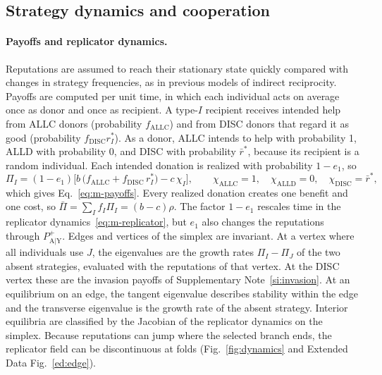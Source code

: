\documentclass[fleqn,10pt]{wlscirep}
\newcommand{\Pp}[1]{P^{+}_{\mathrm{#1}}}   %
\newcommand{\ALLC}{\mathrm{ALLC}}
\newcommand{\ALLD}{\mathrm{ALLD}}
\newcommand{\DISC}{\mathrm{DISC}}
\theoremstyle{plain}
\begin{document}
\subsection{Strategy dynamics and cooperation}
\label{si:evolution}

\paragraph{Payoffs and replicator dynamics.} Reputations are assumed to reach their stationary state quickly compared with changes in strategy frequencies, as in previous models of indirect reciprocity. Payoffs are computed per unit time, in which each individual acts on average once as donor and once as recipient. A type-$I$ recipient receives intended help from ALLC donors (probability $f_{\ALLC}$) and from DISC donors that regard it as good (probability $f_{\DISC}r^*_I$). As a donor, ALLC intends to help with probability 1, ALLD with probability 0, and DISC with probability $\bar r^*$, because its recipient is a random individual. Each intended donation is realized with probability $1-e_1$, so
\begin{equation}
\Pi_I=(1-e_1)\bigl[b\,\bigl(f_{\ALLC}+f_{\DISC}\,r^*_I\bigr)-c\,\chi_I\bigr],\qquad
\chi_{\ALLC}=1,\quad \chi_{\ALLD}=0,\quad \chi_{\DISC}=\bar r^*,
\label{eq:s-payoffs}
\end{equation}
which gives Eq.~\eqref{eq:m-payoffs}. Every realized donation creates one benefit and one cost, so $\bar\Pi=\sum_If_I\Pi_I=(b-c)\rho$. The factor $1-e_1$ rescales time in the replicator dynamics~\eqref{eq:m-replicator}, but $e_1$ also changes the reputations through $\Pp{A|Y}$. Edges and vertices of the simplex are invariant. At a vertex where all individuals use $J$, the eigenvalues are the growth rates $\Pi_I-\Pi_J$ of the two absent strategies, evaluated with the reputations of that vertex. At the DISC vertex these are the invasion payoffs of Supplementary Note~\ref{si:invasion}. At an equilibrium on an edge, the tangent eigenvalue describes stability within the edge and the transverse eigenvalue is the growth rate of the absent strategy. Interior equilibria are classified by the Jacobian of the replicator dynamics on the simplex. Because reputations can jump where the selected branch ends, the replicator field can be discontinuous at folds (Fig.~\ref{fig:dynamics} and Extended Data Fig.~\ref{ed:edge}).
\end{document}
